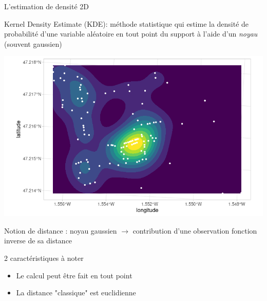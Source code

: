 \documentclass[9pt]{beamer}
\begin{document}
\begin{frame}{L'estimation de densité 2D}

Kernel Density Estimate (KDE): méthode statistique qui estime la densité de probabilité d'une variable aléatoire \alert{en tout point du support } à l'aide d'un \textit{noyau} (souvent gaussien)\\
\begin{center}
\includegraphics[height=0.3\textwidth]{ressources/images/KDE_raster.png} 
\end{center}


Notion de \alert{distance} :  noyau gaussien $\rightarrow$ contribution d'une observation fonction inverse de sa distance  \\


\vspace{0.5cm}



\begin{scriptsize}
2 caractéristiques à noter  

\begin{itemize} 
  \item Le calcul peut être fait en tout point 
  \item La distance "classique" est euclidienne
\end{itemize}




\end{scriptsize}
\end{frame}
\end{document}
